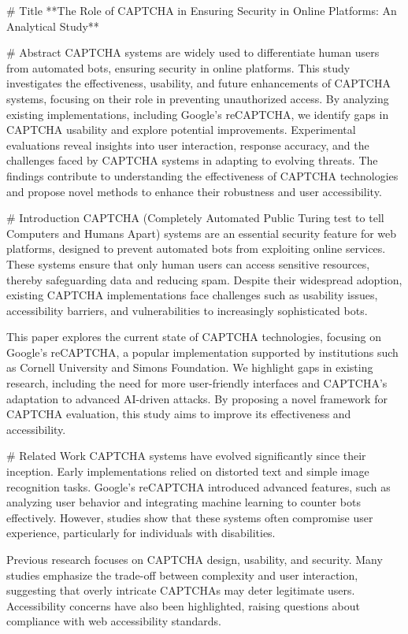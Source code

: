 # Title  
**The Role of CAPTCHA in Ensuring Security in Online Platforms: An Analytical Study**

# Abstract  
CAPTCHA systems are widely used to differentiate human users from automated bots, ensuring security in online platforms. This study investigates the effectiveness, usability, and future enhancements of CAPTCHA systems, focusing on their role in preventing unauthorized access. By analyzing existing implementations, including Google's reCAPTCHA, we identify gaps in CAPTCHA usability and explore potential improvements. Experimental evaluations reveal insights into user interaction, response accuracy, and the challenges faced by CAPTCHA systems in adapting to evolving threats. The findings contribute to understanding the effectiveness of CAPTCHA technologies and propose novel methods to enhance their robustness and user accessibility.

# Introduction  
CAPTCHA (Completely Automated Public Turing test to tell Computers and Humans Apart) systems are an essential security feature for web platforms, designed to prevent automated bots from exploiting online services. These systems ensure that only human users can access sensitive resources, thereby safeguarding data and reducing spam. Despite their widespread adoption, existing CAPTCHA implementations face challenges such as usability issues, accessibility barriers, and vulnerabilities to increasingly sophisticated bots.

This paper explores the current state of CAPTCHA technologies, focusing on Google's reCAPTCHA, a popular implementation supported by institutions such as Cornell University and Simons Foundation. We highlight gaps in existing research, including the need for more user-friendly interfaces and CAPTCHA's adaptation to advanced AI-driven attacks. By proposing a novel framework for CAPTCHA evaluation, this study aims to improve its effectiveness and accessibility.

# Related Work  
CAPTCHA systems have evolved significantly since their inception. Early implementations relied on distorted text and simple image recognition tasks. Google's reCAPTCHA introduced advanced features, such as analyzing user behavior and integrating machine learning to counter bots effectively. However, studies show that these systems often compromise user experience, particularly for individuals with disabilities.

Previous research focuses on CAPTCHA design, usability, and security. Many studies emphasize the trade-off between complexity and user interaction, suggesting that overly intricate CAPTCHAs may deter legitimate users. Accessibility concerns have also been highlighted, raising questions about compliance with web accessibility standards.

